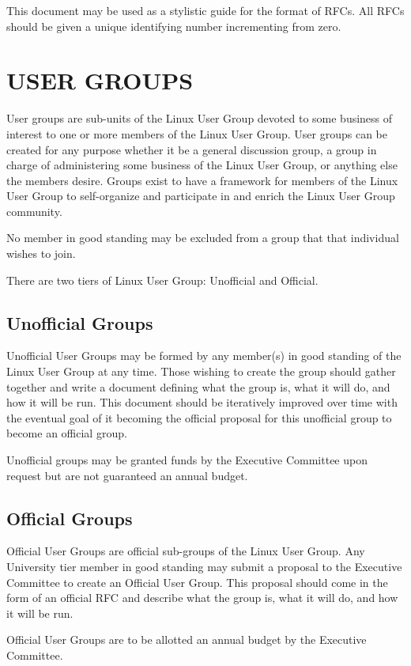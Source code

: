 \documentclass[letter]{report}
\begin{document}
This document may be used as a stylistic guide for the format of RFCs. All RFCs
should be given a unique identifying number incrementing from zero.


\chapter{USER GROUPS}
User groups are sub-units of the Linux User Group devoted to some business of
interest to one or more members of the Linux User Group. User groups can be
created for any purpose whether it be a general discussion group, a group in
charge of administering some business of the Linux User Group, or anything else
the members desire. Groups exist to have a framework for members of the Linux
User Group to self-organize and participate in and enrich the Linux User Group
community.

No member in good standing may be excluded from a group that that individual
wishes to join.

There are two tiers of Linux User Group: Unofficial and Official.

\section{Unofficial Groups}
Unofficial User Groups may be formed by any member(s) in good standing of the
Linux User Group at any time. Those wishing to create the group should gather
together and write a document defining what the group is, what it will do, and
how it will be run. This document should be iteratively improved over time with
the eventual goal of it becoming the official proposal for this unofficial group
to become an official group.

Unofficial groups may be granted funds by the Executive Committee upon request
but are not guaranteed an annual budget.

\section{Official Groups}
Official User Groups are official sub-groups of the Linux User Group. Any
University tier member in good standing may submit a proposal to the Executive
Committee to create an Official User Group. This proposal should come in the
form of an official RFC and describe what the group is, what it will do, and how
it will be run.

Official User Groups are to be allotted an annual budget by the Executive
Committee.
\end{document}

